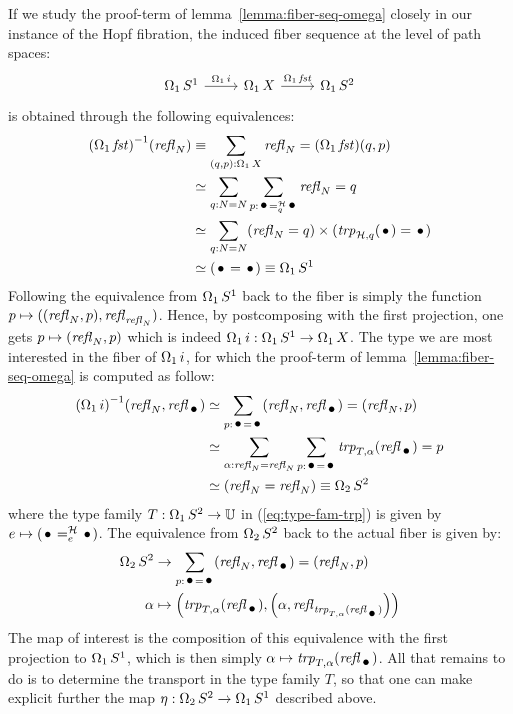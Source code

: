 \documentclass[english,a4]{article}
\def\U{\universe U}%
\begin{document}
If we study the proof-term of lemma~\ref{lemma:fiber-seq-omega}
closely in our instance of the Hopf fibration, the induced fiber
sequence at the level of path spaces:
\begin{equation}
  \label{eq:12}
  \begin{tikzcd}
    \loopspace 1 \Sc \rar["\loopspace 1 i"] & \loopspace 1 X \rar["\loopspace 1 \fst"] & \loopspace 1 \Sp
  \end{tikzcd}
\end{equation}
is obtained through the following equivalences:
\begin{align}
  \inv {(\loopspace 1 \fst)} {(\refl N)}
  &\jdeq \sum_{(q,p):\loopspace 1 X}\refl N = (\loopspace 1 \fst)(q,p)
  \\
  &\weq \sum_{q:N=N}\sum_{p:\pathover \base {\hopffam} q \base}\refl N = q
  \\
  &\weq \sum_{q:N=N}(\refl N = q)\times(\trp{\hopffam, q}(\base) =\base)
  \\
  &\weq (\base = \base) \jdeq \loopspace 1 \Sc
\end{align}
Following the equivalence from $\operatorname{\Omega_{1}} {S^1}$ back to the fiber is
simply the function $p \mapsto ((\mathop{{\mathit{refl}}_{N}},p),\mathop{{\mathit{refl}}_{\mathop{{\mathit{refl}}_{N}}}})$. Hence,
by postcomposing with the first projection, one gets
$p \mapsto (\mathop{{\mathit{refl}}_{N}}, p)$ which is indeed
$\operatorname{\Omega_{1}} i: \operatorname{\Omega_{1}} {S^1} \to \operatorname{\Omega_{1}} X$. The type we are
most interested in the fiber of $\operatorname{\Omega_{1}} i$, for which the
proof-term of lemma~\ref{lemma:fiber-seq-omega} is computed as follow:
\begin{align}
  \inv {(\loopspace 1 i)} {(\refl N,\refl\base)}
  &\weq \sum_{p:\base = \base}(\refl N,\refl\base) = (\refl N,p)
  \\
  &\weq \sum_{\alpha:\refl N = \refl N}\sum_{p:\base=\base}\trp {T,\alpha}(\refl \base)
 = p \label{eq:type-fam-trp}
  \\
  &\weq (\refl N = \refl N) \jdeq \loopspace 2 \Sp
\end{align}
where the type family $T:\loopspace 1 \Sp \to \U$ in
(\ref{eq:type-fam-trp}) is given by
$e\mapsto {(\pathover \base \hopffam e \base)}$. The equivalence from
$\operatorname{\Omega_{2}} S^2$ back to the actual fiber is given by:
\begin{equation}
  \begin{aligned}
    \loopspace 2 \Sp &\to \sum_{p:\base = \base}(\refl N,\refl\base) =
    (\refl N,p)
    \\
    \alpha &\mapsto \left(\trp{T,\alpha}(\refl\base), \left(\alpha,
        \refl{\trp{T,\alpha}(\refl\base)}\right)\right)
  \end{aligned}
\end{equation}
The map of interest is the composition of this equivalence with the
first projection to $\operatorname{\Omega_{1}} {S^1}$, which is then simply
$\alpha \mapsto \trp{T,\alpha}(\refl \base)$. All that remains to do
is to determine the transport in the type family $T$, so that one can
make explicit further the map $\eta:\operatorname{\Omega_{2}} S^2 \to \operatorname{\Omega_{1}} {S^1}$
described above.
\end{document}
